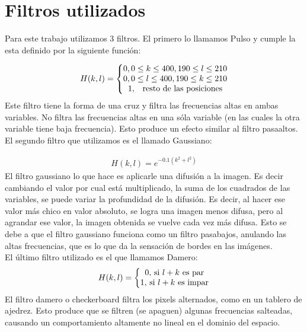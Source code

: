 \documentclass[11pt,a4paper]{emulateapj}
\begin{document}
\section{Filtros utilizados}
\label{sec:sec2}
Para este trabajo utilizamos 3 filtros. El primero lo llamamos Pulso y cumple la esta definido por la siguiente función:

\begin{eqnarray}
H(k,l) = \left\{
	\begin{matrix}
		0, 0 \leq k \leq 400, 190 \leq l \leq 210 \\
		0, 0 \leq l \leq 400, 190 \leq k \leq 210 \\
		1, \quad $resto de las posiciones$
	\end{matrix} 
	\right.
\end{eqnarray}
Este filtro tiene la forma de una cruz y filtra las frecuencias altas en ambas variables. No filtra las frecuencias altas en
una sóla variable (en las cuales la otra variable tiene baja frecuencia). Esto produce un efecto similar al filtro
pasaaltos.\\
El segundo filtro que utilizamos es el llamado Gaussiano:

\begin{eqnarray}
H(k,l) = e^{-0.1(k^2 + l^2)}
\end{eqnarray}
El filtro gaussiano lo que hace es aplicarle una difusión a la imagen. Es decir cambiando el valor por cual está multiplicado, la suma de los cuadrados de las variables, se puede variar la profundidad de la difusión. Es decir, al hacer ese valor más chico en valor absoluto, se logra una imagen menos difusa, pero al agrandar ese valor, la imagen obtenida se vuelve cada vez más difusa. Esto se debe a que el filtro gaussiano funciona como un filtro pasabajos, anulando las altas frecuencias, que es lo que da la sensación de bordes en las imágenes.
\\
El último filtro utilizado es el que llamamos Damero:
\begin{eqnarray}
H(k,l) = \left\{
	\begin{matrix}
		0,$ si $l+k$ es par$\\
		1,$ si $l+k$ es impar$\\
	\end{matrix} 
	\right.
\end{eqnarray}
El filtro damero o checkerboard filtra los pixels alternados, como en un tablero de ajedrez. Esto produce que se 
filtren (se apaguen) algunas frecuencias salteadas, causando un comportamiento altamente no lineal en el dominio
del espacio.
\end{document}

